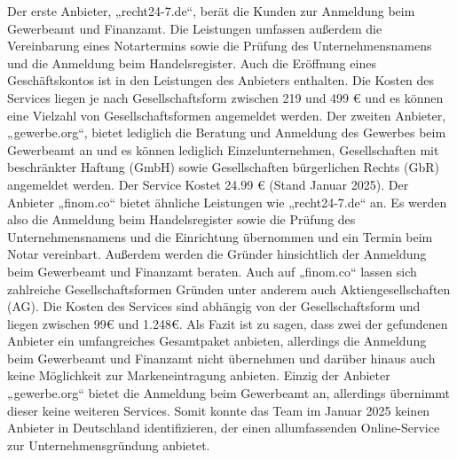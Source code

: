 Der erste Anbieter, „recht24-7.de“, berät die Kunden zur Anmeldung beim Gewerbeamt und Finanzamt. Die Leistungen umfassen außerdem die Vereinbarung eines Notartermins sowie die Prüfung des Unternehmensnamens und die Anmeldung beim Handelsregister. Auch die Eröffnung eines Geschäftskontos ist in den Leistungen des Anbieters enthalten. Die Kosten des Services liegen je nach Gesellschaftsform zwischen 219 und 499 € und es können eine Vielzahl von Gesellschaftsformen angemeldet werden. 
Der zweiten Anbieter, „gewerbe.org“, bietet lediglich die Beratung und Anmeldung des Gewerbes beim Gewerbeamt an und es können lediglich Einzelunternehmen, Gesellschaften mit beschränkter Haftung (GmbH) sowie Gesellschaften bürgerlichen Rechts (GbR) angemeldet werden. Der Service Kostet 24.99 € (Stand Januar 2025). 
Der Anbieter „finom.co“ bietet ähnliche Leistungen wie „recht24-7.de“ an. Es werden also die Anmeldung beim Handelsregister sowie die Prüfung des Unternehmensnamens und die Einrichtung übernommen und ein Termin beim Notar vereinbart. Außerdem werden die Gründer hinsichtlich der Anmeldung beim Gewerbeamt und Finanzamt beraten. Auch auf „finom.co“ lassen sich zahlreiche Gesellschaftsformen Gründen unter anderem auch Aktiengesellschaften (AG). Die Kosten des Services sind abhängig von der Gesellschaftsform und liegen zwischen 99€ und 1.248€. 
Als Fazit ist zu sagen, dass zwei der gefundenen Anbieter ein umfangreiches Gesamtpaket anbieten, allerdings die Anmeldung beim Gewerbeamt und Finanzamt nicht übernehmen und darüber hinaus auch keine Möglichkeit zur Markeneintragung anbieten. Einzig der Anbieter „gewerbe.org“ bietet die Anmeldung beim Gewerbeamt an, allerdings übernimmt dieser keine weiteren Services. Somit konnte das Team im Januar 2025 keinen Anbieter in Deutschland identifizieren, der einen allumfassenden Online-Service zur Unternehmensgründung anbietet. 
